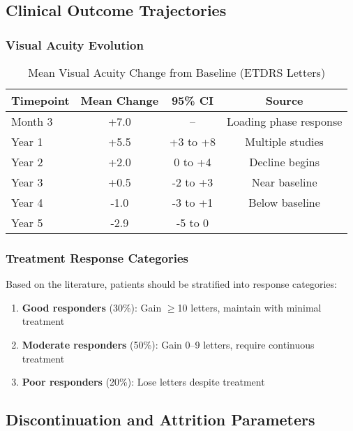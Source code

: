 \subsection{Clinical Outcome Trajectories}

\subsubsection{Visual Acuity Evolution}
\begin{table}[h]
\centering
\caption{Mean Visual Acuity Change from Baseline (ETDRS Letters)}
\begin{tabular}{lccc}
\hline
Timepoint & Mean Change & 95\% CI & Source \\
\hline
Month 3 & +7.0 & -- & Loading phase response \\
Year 1 & +5.5 & +3 to +8 & Multiple studies \\
Year 2 & +2.0 & 0 to +4 & Decline begins \\
Year 3 & +0.5 & -2 to +3 & Near baseline \\
Year 4 & -1.0 & -3 to +1 & Below baseline \\
Year 5 & -2.9 & -5 to 0 & \citet{kimImpactInjectionFrequency2020} \\
\hline
\end{tabular}
\end{table}

\subsubsection{Treatment Response Categories}
Based on the literature, patients should be stratified into response categories:
\begin{enumerate}
    \item \textbf{Good responders} (30\%): Gain $\geq$10 letters, maintain with minimal treatment
    \item \textbf{Moderate responders} (50\%): Gain 0--9 letters, require continuous treatment
    \item \textbf{Poor responders} (20\%): Lose letters despite treatment
\end{enumerate}

\subsection{Discontinuation and Attrition Parameters}

